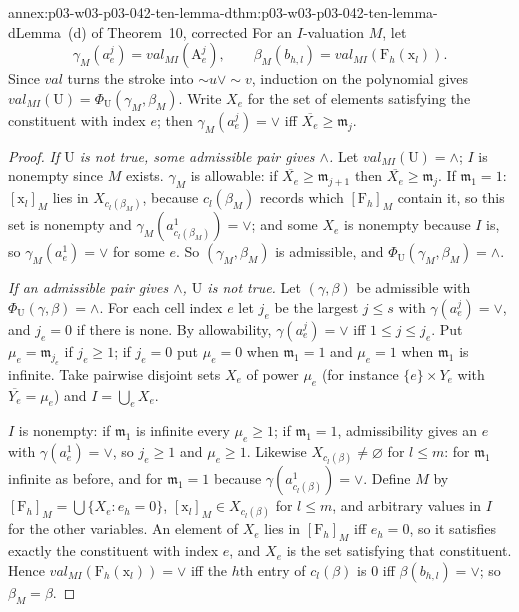 \begin{annexitem}{annex:p03-w03-p03-042-ten-lemma-d}{thm:p03-w03-p03-042-ten-lemma-d}{Lemma~(d) of Theorem~10, corrected}
For an \(I\)-valuation \(M\), let
\[
 \gamma_M(a^j_e)=\mathit{val}_{MI}(\mathrm A^j_e),\qquad
 \beta_M(b_{h,l})=\mathit{val}_{MI}(\mathrm F_h(\mathrm x_l)).
\]  Since \(\mathit{val}\) turns the stroke into
\({\sim}u\vee{\sim}v\), induction on the polynomial gives
\(\mathit{val}_{MI}(\mathrm U)=\Phi_{\mathrm U}(\gamma_M,\beta_M)\).
Write \(X_e\) for the set of elements satisfying the constituent with
index \(e\); then \(\gamma_M(a^j_e)=\vee\) iff \(\overline{X_e}\geq
\mathfrak m_j\).
\begin{proof}
\emph{If \(\mathrm U\) is not true, some admissible pair gives
\(\wedge\).}  Let \(\mathit{val}_{MI}(\mathrm U)=\wedge\); \(I\) is
nonempty since \(M\) exists.  \(\gamma_M\) is allowable: if
\(\overline{X_e}\geq\mathfrak m_{j+1}\) then \(\overline{X_e}\geq
\mathfrak m_j\).  If \(\mathfrak m_1=1\): \([\mathrm x_l]_M\) lies in
\(X_{c_l(\beta_M)}\), because \(c_l(\beta_M)\) records which
\([\mathrm F_h]_M\) contain it, so this set is nonempty and
\(\gamma_M(a^1_{c_l(\beta_M)})=\vee\); and some \(X_e\) is nonempty
because \(I\) is, so \(\gamma_M(a^1_e)=\vee\) for some \(e\).  So
\((\gamma_M,\beta_M)\) is admissible, and \(\Phi_{\mathrm U}(\gamma_M,
\beta_M)=\wedge\).

\emph{If an admissible pair gives \(\wedge\), \(\mathrm U\) is not
true.}  Let \((\gamma,\beta)\) be admissible with \(\Phi_{\mathrm U}
(\gamma,\beta)=\wedge\).  For each cell index \(e\) let \(j_e\) be the
largest \(j\leq s\) with \(\gamma(a^j_e)=\vee\), and \(j_e=0\) if there is
none.  By allowability, \(\gamma(a^j_e)=\vee\) iff \(1\leq j\leq j_e\).
Put \(\mu_e=\mathfrak m_{j_e}\) if \(j_e\geq1\); if \(j_e=0\) put
\(\mu_e=0\) when \(\mathfrak m_1=1\) and \(\mu_e=1\) when \(\mathfrak m_1\)
is infinite.  Take pairwise disjoint sets \(X_e\) of power \(\mu_e\) (for
instance \(\{e\}\times Y_e\) with \(\overline{Y_e}=\mu_e\)) and
\(I=\bigcup_eX_e\).

\(I\) is nonempty: if \(\mathfrak m_1\) is infinite every \(\mu_e\geq1\);
if \(\mathfrak m_1=1\), admissibility gives an \(e\) with
\(\gamma(a^1_e)=\vee\), so \(j_e\geq1\) and \(\mu_e\geq1\).  Likewise
\(X_{c_l(\beta)}\neq\varnothing\) for \(l\leq m\): for \(\mathfrak m_1\)
infinite as before, and for \(\mathfrak m_1=1\) because
\(\gamma(a^1_{c_l(\beta)})=\vee\).  Define \(M\) by \([\mathrm
F_h]_M=\bigcup\{X_e:e_h=0\}\), \([\mathrm x_l]_M\in X_{c_l(\beta)}\) for
\(l\leq m\), and arbitrary values in \(I\) for the other variables.  An
element of \(X_e\) lies in \([\mathrm F_h]_M\) iff \(e_h=0\), so it
satisfies exactly the constituent with index \(e\), and \(X_e\) is the set
satisfying that constituent.  Hence \(\mathit{val}_{MI}(\mathrm
F_h(\mathrm x_l))=\vee\) iff the \(h\)th entry of \(c_l(\beta)\) is \(0\)
iff \(\beta(b_{h,l})=\vee\); so \(\beta_M=\beta\).


\end{proof}
\end{annexitem}

